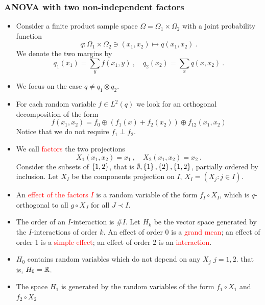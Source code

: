\documentclass[xcolor=svgnames]{beamer}
\newcommand{\rosso}[1]{\textcolor{red}{#1}}
\renewcommand{\emph}{\rosso}
\begin{document}
    \begin{frame}\small\frametitle{ANOVA with two non-independent factors}

    \begin{itemize}
    \item Consider a finite product sample space $\Omega = \Omega_1 \times \Omega_2$ with a joint probability function 
    \begin{equation*}
       q \colon  \Omega_1 \times \Omega _2 \ni (x_1,x_2) \mapsto q(x_1,x_2) \ . 
    \end{equation*}
    We denote the two margins by 
    \begin{equation*}
    q_1(x_1) = \sum_y f(x_1,y) \ , \quad q_2(x_2) = \sum_x q(x,x_2) \ .
    \end{equation*}
    \item We focus on the case $q \neq q_1 \otimes q_2$.
    \item For each random variable $f \in L^2(q)$ we look for an orthogonal decomposition of the form
    \begin{equation*}
        f(x_1,x_2) = f_0 \oplus (f_1(x) + f_2(x_2)) \oplus f_{12}(x_1,x_2)
    \end{equation*}
    Notice that we do not require $f_1 \perp f_2$.
    \item We call \emph{factors} the two projections \begin{equation*}
    X_1(x_1,x_2) = x_1 \ , \quad X_2(x_1,x_2) = x_2 \ .  
    \end{equation*}
    Consider the subsets of $\left\{1,2\right\}$, that is $\emptyset, \left\{1\right\},\left\{2\right\},\left\{1,2\right\}$, partially ordered by inclusion. Let $X_I$ be the components projection on $I$, $X_I = (X_j \colon j \in I)$. 
    \item An \emph{effect of the factors $I$} is a random variable of the form $f_I\circ X_I$, which is $q$-orthogonal to all $g \circ X_J$ for all $J \prec I$.
    \item The order of an $I$-interaction is $\# I$. Let $H_k$ be the vector space generated by the $I$-interactions of order $k$. An effect of order 0 is a \emph{grand mean}; an effect of order 1 is a \emph{simple effect}; an effect of order 2 is an \emph{interaction}.
    \item $H_0$ contains random variables which do not depend on any $X_j$ $j=1,2$. that is, $H_0 = \mathbb{R}$.
    \item The space $H_1$ is generated by the random variables of the form 
        $f_1\circ X_1$ and $f_2\circ X_2$

\end{itemize}
\end{frame}
\end{document}
